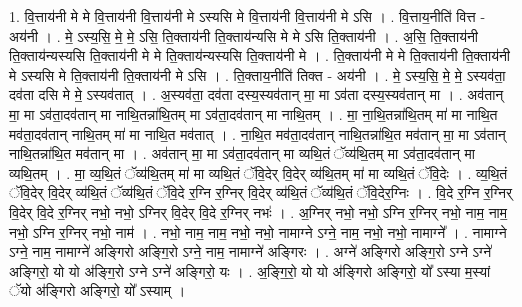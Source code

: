 \documentclass[17pt]{extarticle}
\begin{document}
1. वि॒त्ताय॑नी मे मे वि॒त्ताय॑नी वि॒त्ताय॑नी मे ऽस्यसि मे वि॒त्ताय॑नी वि॒त्ताय॑नी मे ऽसि । . वि॒त्ताय॒नीति॑ वित्त - अय॑नी । . मे॒ ऽस्य॒सि॒ मे॒ मे॒ ऽसि॒ ति॒क्ताय॑नी ति॒क्ताय॑न्यसि मे मे ऽसि ति॒क्ताय॑नी । . अ॒सि॒ ति॒क्ताय॑नी ति॒क्ताय॑न्यस्यसि ति॒क्ताय॑नी मे मे ति॒क्ताय॑न्यस्यसि ति॒क्ताय॑नी मे । . ति॒क्ताय॑नी मे मे ति॒क्ताय॑नी ति॒क्ताय॑नी मे ऽस्यसि मे ति॒क्ताय॑नी ति॒क्ताय॑नी मे ऽसि । . ति॒क्ताय॒नीति॑ तिक्त - अय॑नी । . मे॒ ऽस्य॒सि॒ मे॒ मे॒ ऽस्यव॑ता॒ दव॑ता दसि मे मे॒ ऽस्यव॑तात् । . अ॒स्यव॑ता॒ दव॑ता दस्य॒स्यव॑तान् मा॒ मा ऽव॑ता दस्य॒स्यव॑तान् मा । . अव॑तान् मा॒ मा ऽव॑ता॒दव॑तान् मा नाथि॒तन्ना॑थि॒तम् मा ऽव॑ता॒दव॑तान् मा नाथि॒तम् । . मा॒ ना॒थि॒तन्ना॑थि॒तम् मा॑ मा नाथि॒त मव॑ता॒दव॑तान् नाथि॒तम् मा॑ मा नाथि॒त मव॑तात् । . ना॒थि॒त मव॑ता॒दव॑तान् नाथि॒तन्ना॑थि॒त मव॑तान् मा॒ मा ऽव॑तान् नाथि॒तन्ना॑थि॒त मव॑तान् मा । . अव॑तान् मा॒ मा ऽव॑ता॒दव॑तान् मा व्यथि॒तं ॅव्य॑थि॒तम् मा ऽव॑ता॒दव॑तान् मा व्यथि॒तम् । . मा॒ व्य॒थि॒तं ॅव्य॑थि॒तम् मा॑ मा व्यथि॒तं ॅवि॒देर् वि॒देर् व्य॑थि॒तम् मा॑ मा व्यथि॒तं ॅवि॒देः । . व्य॒थि॒तं ॅवि॒देर् वि॒देर् व्य॑थि॒तं ॅव्य॑थि॒तं ॅवि॒दे र॒ग्नि र॒ग्निर् वि॒देर् व्य॑थि॒तं ॅव्य॑थि॒तं ॅवि॒देर॒ग्निः । . वि॒दे र॒ग्नि र॒ग्निर् वि॒देर् वि॒दे र॒ग्निर् नभो॒ नभो॒ ऽग्निर् वि॒देर् वि॒दे र॒ग्निर् नभः॑ । . अ॒ग्निर् नभो॒ नभो॒ ऽग्नि र॒ग्निर् नभो॒ नाम॒ नाम॒ नभो॒ ऽग्नि र॒ग्निर् नभो॒ नाम॑ । . नभो॒ नाम॒ नाम॒ नभो॒ नभो॒ नामाग्ने ऽग्ने॒ नाम॒ नभो॒ नभो॒ नामाग्ने᳚ । . नामाग्ने ऽग्ने॒ नाम॒ नामाग्ने॑ अङ्गिरो अङ्गि॒रो ऽग्ने॒ नाम॒ नामाग्ने॑ अङ्गिरः । . अग्ने॑ अङ्गिरो अङ्गि॒रो ऽग्ने ऽग्ने॑ अङ्गिरो॒ यो यो अ॑ङ्गि॒रो ऽग्ने ऽग्ने॑ अङ्गिरो॒ यः । . अ॒ङ्गि॒रो॒ यो यो अ॑ङ्गिरो अङ्गिरो॒ यो᳚ ऽस्या म॒स्यां ॅयो अ॑ङ्गिरो अङ्गिरो॒ यो᳚ ऽस्याम् । \newline
\end{document}
